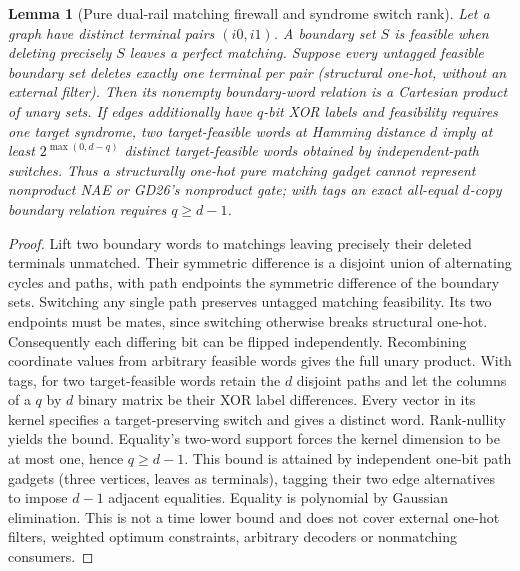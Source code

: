 \documentclass[11pt]{article}
\newtheorem{lemma}[theorem]{Lemma}
\begin{document}
\begin{lemma}[Pure dual-rail matching firewall and syndrome switch rank]\label{lem:m26-rail}
Let a graph have distinct terminal pairs $(i0,i1)$. A boundary set $S$ is feasible when deleting precisely $S$ leaves a perfect matching. Suppose every untagged feasible boundary set deletes exactly one terminal per pair (structural one-hot, without an external filter). Then its nonempty boundary-word relation is a Cartesian product of unary sets. If edges additionally have $q$-bit XOR labels and feasibility requires one target syndrome, two target-feasible words at Hamming distance $d$ imply at least $2^{\max(0,d-q)}$ distinct target-feasible words obtained by independent-path switches. Thus a structurally one-hot pure matching gadget cannot represent nonproduct NAE or GD26's nonproduct gate; with tags an exact all-equal $d$-copy boundary relation requires $q\ge d-1$.
\end{lemma}
\begin{proof}
Lift two boundary words to matchings leaving precisely their deleted terminals unmatched. Their symmetric difference is a disjoint union of alternating cycles and paths, with path endpoints the symmetric difference of the boundary sets. Switching any single path preserves untagged matching feasibility. Its two endpoints must be mates, since switching otherwise breaks structural one-hot. Consequently each differing bit can be flipped independently. Recombining coordinate values from arbitrary feasible words gives the full unary product. With tags, for two target-feasible words retain the $d$ disjoint paths and let the columns of a $q$ by $d$ binary matrix be their XOR label differences. Every vector in its kernel specifies a target-preserving switch and gives a distinct word. Rank-nullity yields the bound. Equality's two-word support forces the kernel dimension to be at most one, hence $q\ge d-1$. This bound is attained by independent one-bit path gadgets (three vertices, leaves as terminals), tagging their two edge alternatives to impose $d-1$ adjacent equalities. Equality is polynomial by Gaussian elimination. This is not a time lower bound and does not cover external one-hot filters, weighted optimum constraints, arbitrary decoders or nonmatching consumers.
\end{proof}
\end{document}
